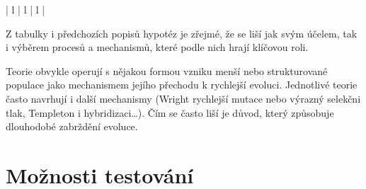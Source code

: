 \begin{longtable}{| l | l | l |}
 \\

\hline

\caption{Srovnání hypotéz}
\label{srovteorie}

\end{longtable}
\normalsize

Z tabulky i předchozích popisů hypotéz je zřejmé, že se liší jak svým účelem, tak i výběrem procesů a mechanismů,
které podle nich hrají klíčovou roli.

Teorie obvykle operují s nějakou formou vzniku menší nebo strukturované populace jako mechanismem jejího přechodu
k rychlejší evoluci. Jednotlivé teorie často navrhují i další mechanismy (Wright rychlejší mutace nebo výrazný
selekčni tlak, Templeton i hybridizaci\ldots). Čím se často liší je důvod, který způsobuje dlouhodobé zabrždění evoluce.




\section{Možnosti testování}
%
